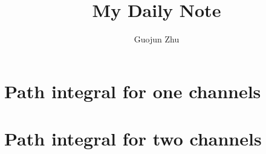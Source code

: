 \documentclass{book}
\author{Guojun Zhu}
\title{My Daily Note}
\begin{document}

{}


%
%
%
%
%
%
\chapter{Path integral for one channels}

\chapter{Path integral for two channels}



\end{document}
